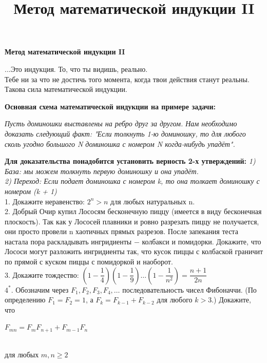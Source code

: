 \centerline{\bf \Huge Метод математической индукции II}
\title{Метод математической индукции II}
\begin{flushright}
    \scriptsize{...Это индукция. То, что ты видишь, реально.\\ 
    Тебе ни за что не достичь того момента, когда твои действия станут реальны.\\
    Такова сила математической индукции.}
\end{flushright}

\textbf{Основная схема математической индукции на примере задачи:}

\par \textit{Пусть доминошки выставлены на ребро друг за другом. Нам необходимо доказать следующий факт: "Если толкнуть 1-ю доминошку, то для любого сколь угодно большого N доминошка с номером N когда-нибудь упадёт".}

\par\textbf{Для доказательства понадобится установить верность 2-х утверждений:}
\textit{1) База: мы можем толкнуть первую доминошку и она упадёт.}\\
\textit{2) Переход: Если подает доминошка с номером k, то она толкает доминошку с номером (k + 1)}\\

1. Докажите неравенство: $2^{n}>n$ для любых натуральных n.\\

2. Добрый Очир купил Лососям бесконечную пиццу (имеется в виду бесконечная плоскость). Так как у Лососей плавники и ровно разрезать пиццу не получается, они просто провели n хаотичных прямых разрезов. После запекания теста настала пора раскладывать ингридиенты $-$ колбакси и помидорки. Докажите, что Лососи могут разложить ингридиенты так, что кусок пиццы с колбаской граничит по прямой с куском пиццы с помидоркой и наоборот.\\

3. Докажите тождество: $(1-\dfrac{1}{4})(1-\dfrac{1}{9})\dots(1-\dfrac{1}{n^{2}})=\dfrac{n+1}{2n}$\\

$4^{*}$. Обозначим через $F_1, F_2, F_3, F_4, \dots$ последовательность чисел Фибоначчи. (По определению $F_1 = F_2 = 1$, а $F_k = F_{k-1} + F_{k-2}$ для любого $k>3$.) Докажите, что \\
\begin{center}
  $F_{mn}=F_mF_{n+1}+F_{m-1}F_n$
\end{center}
\\
для любых $m, n \geq 2$